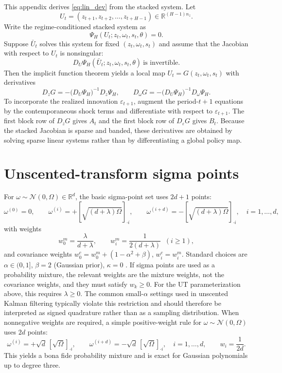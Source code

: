 \documentclass[11pt]{article}
\theoremstyle{remark}
\newcommand{\R}{\mathbb{R}}
\begin{document}
This appendix derives \eqref{eq:lin_dev} from the stacked system.
Let
\[
U_t=(z_{t+1},z_{t+2},\ldots,z_{t+H-1})\in\R^{(H-1)n_z}.
\]
Write the regime-conditioned stacked system as
\[
\Psi_H(U_t;z_t,\omega_t,s_t,\theta)=0.
\]
Suppose $\bar U_t$ solves this system for fixed $(z_t,\omega_t,s_t)$ and assume that the Jacobian with respect to $U_t$ is nonsingular:
\[
D_{U}\Psi_H(\bar U_t;z_t,\omega_t,s_t,\theta)\ \text{is invertible}.
\]
Then the implicit function theorem yields a local map $U_t=G(z_t,\omega_t,s_t)$ with derivatives
\[
D_{z}G = -\big(D_U\Psi_H\big)^{-1} D_z \Psi_H,
\qquad
D_{\omega}G = -\big(D_U\Psi_H\big)^{-1} D_\omega \Psi_H.
\]
To incorporate the realized innovation $\varepsilon_{t+1}$, augment the period-$t+1$ equations by the contemporaneous shock terms and differentiate with respect to $\varepsilon_{t+1}$.
The first block row of $D_zG$ gives $A_t$ and the first block row of $D_\varepsilon G$ gives $B_t$.
Because the stacked Jacobian is sparse and banded, these derivatives are obtained by solving sparse linear systems rather than by differentiating a global policy map.

\section{Unscented-transform sigma points}
\label{app:ut}

For $\omega\sim\mathcal{N}(0,\Omega)\in\R^d$, the basic sigma-point set uses $2d+1$ points:
\[
\omega^{(0)}=0,\qquad
\omega^{(i)}=+\left[\sqrt{(d+\lambda)\Omega}\right]_{\cdot i},\qquad
\omega^{(i+d)}=-\left[\sqrt{(d+\lambda)\Omega}\right]_{\cdot i},
\quad i=1,\ldots,d,
\]
with weights
\[
w_0^m=\frac{\lambda}{d+\lambda},\qquad w_i^m=\frac{1}{2(d+\lambda)}\;\;(i\ge 1),
\]
and covariance weights $w_0^c=w_0^m + (1-\alpha^2+\beta)$, $w_i^c=w_i^m$.
Standard choices are $\alpha\in(0,1]$, $\beta=2$ (Gaussian prior), $\kappa=0$ \citep{JulierUhlmann2004}.
If sigma points are used as a probability mixture, the relevant weights are the mixture weights, not the covariance weights, and they must satisfy $w_k\ge 0$.
For the UT parameterization above, this requires $\lambda\ge 0$.
The common small-$\alpha$ settings used in unscented Kalman filtering typically violate this restriction and should therefore be interpreted as signed quadrature rather than as a sampling distribution.
When nonnegative weights are required, a simple positive-weight rule for $\omega\sim\mathcal{N}(0,\Omega)$ uses $2d$ points:
\[
\omega^{(i)}=+\sqrt{d}\,\left[\sqrt{\Omega}\right]_{\cdot i},\qquad
\omega^{(i+d)}=-\sqrt{d}\,\left[\sqrt{\Omega}\right]_{\cdot i},
\quad i=1,\ldots,d,
\qquad
w_i=\frac{1}{2d}.
\]
This yields a bona fide probability mixture and is exact for Gaussian polynomials up to degree three.
\end{document}
